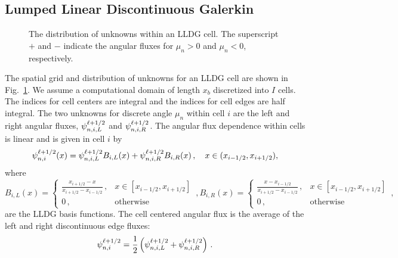 \subsection{Lumped Linear Discontinuous Galerkin \SN}
\begin{figure}
	\centering
	
	\caption{The distribution of unknowns within an LLDG cell. The superscript $+$ and $-$ indicate the angular fluxes for $\mu_n>0$ and $\mu_n<0$, respectively. } 
	\label{fig:lldg_grid}
\end{figure}
The spatial grid and distribution of unknowns for an LLDG cell are shown in Fig.~\ref{fig:lldg_grid}. We assume a computational domain of length $x_b$ discretized into $I$ cells. The indices for cell centers are integral and the indices for cell edges are half integral. 
The two unknowns for discrete angle $\mu_n$ within cell $i$ are the left and right angular fluxes, $\psi_{n,i,L}^{\ell+1/2}$ and $\psi_{n,i,R}^{\ell+1/2}$.  The angular flux dependence within cells is linear and is given in cell $i$ by
\begin{equation} \label{eq:afdef}
\psi_{n,i}^{\ell+1/2}(x) = \psi_{n,i,L}^{\ell+1/2} B_{i,L}(x) + \psi_{n,i,R}^{\ell+1/2} B_{i,R}(x) \,, \quad x \in (x_{i-1/2},x_{i+1/2}),
\end{equation}
where
		\begin{subequations}
		\begin{equation}\label{eq:bfunL}
			B_{i,L}(x) = \begin{cases}
				\frac{x_{i+1/2} - x}{x_{i+1/2} - x_{i-1/2}} \,, & x \in [x_{i-1/2}, x_{i+1/2}] \\ 
				0 \,, & \text{otherwise}
			\end{cases} \,,
		\end{equation}
		\begin{equation}\label{eq:bfunR}
			B_{i,R}(x) = \begin{cases}
				\frac{x - x_{i-1/2}}{x_{i+1/2} - x_{i-1/2}} \,, & x \in [x_{i-1/2}, x_{i+1/2}] \\ 
				0 \,, & \text{otherwise}
			\end{cases} \,,
		\end{equation}
	\end{subequations}
are the LLDG basis functions. 
The cell centered angular flux is the average of the left and right discontinuous edge fluxes:
	\begin{equation} \label{eq:lldg_i}
		\psi_{n,i}^{\ell+1/2} = \frac{1}{2}\left(\psi_{n,i,L}^{\ell+1/2} + \psi_{n,i,R}^{\ell+1/2}\right) \,.
	\end{equation}
